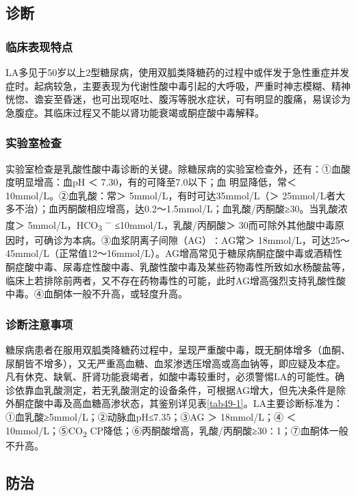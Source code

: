 \subsection{诊断}

\subsubsection{临床表现特点}

LA多见于50岁以上2型糖尿病，使用双胍类降糖药的过程中或伴发于急性重症并发症时。起病较急，主要表现为代谢性酸中毒引起的大呼吸，严重时神志模糊、精神恍惚、谵妄至昏迷，也可出现呕吐、腹泻等脱水症状，可有明显的腹痛，易误诊为急腹症。其临床过程又不能以肾功能衰竭或酮症酸中毒解释。

\subsubsection{实验室检查}

实验室检查是乳酸性酸中毒诊断的关键。除糖尿病的实验室检查外，还有：①血酸度明显增高：血pH
＜ 7.30，有的可降至7.0以下；血{} 明显降低，常＜ 10mmol/L。②血乳酸：常＞
5mmol/L，有时可达35mmol/L（＞
25mmol/L者大多不治）；血丙酮酸相应增高，达0.2～1.5mmol/L；血乳酸/丙酮酸≥30。当乳酸浓度＞
5mmol/L，HCO\textsubscript{3} \textsuperscript{−}
≤10mmol/L，乳酸/丙酮酸＞
30而可除外其他酸中毒原因时，可确诊为本病。③血浆阴离子间隙（AG）∶AG常＞
18mmol/L，可达25～45mmol/L（正常值12～16mmol/L）。AG增高常见于糖尿病酮症酸中毒或酒精性酮症酸中毒、尿毒症性酸中毒、乳酸性酸中毒及某些药物毒性所致如水杨酸盐等，临床上若排除前两者，又不存在药物毒性的可能，此时AG增高强烈支持乳酸性酸中毒。④血酮体一般不升高，或轻度升高。

\subsubsection{诊断注意事项}

糖尿病患者在服用双胍类降糖药过程中，呈现严重酸中毒，既无酮体增多（血酮、尿酮皆不增多），又无严重高血糖、血浆渗透压增高或高血钠等，即应疑及本症。凡有休克、缺氧、肝肾功能衰竭者，如酸中毒较重时，必须警惕LA的可能性。确诊依靠血乳酸测定，若无乳酸测定的设备条件，可根据AG增大，但先决条件是除外酮症酸中毒及高血糖高渗状态，其鉴别详见表\ref{tab49-1}。LA主要诊断标准为：①血乳酸≥5mmol/L；②动脉血pH≤7.35；③AG
＞ 18mmol/L；④{} ＜ 10mmol/L；⑤CO\textsubscript{2}
CP降低；⑥丙酮酸增高，乳酸/丙酮酸≥30∶1；⑦血酮体一般不升高。

\subsection{防治}

